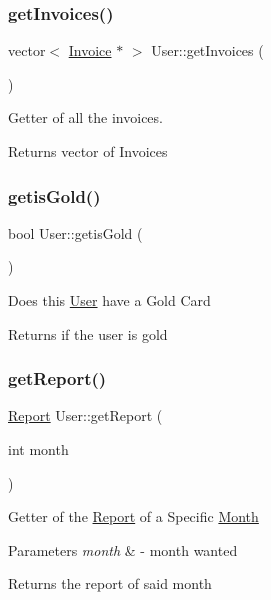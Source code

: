 \subsubsection{\texorpdfstring{get\+Invoices()}{getInvoices()}}
{\footnotesize\ttfamily vector$<$ \mbox{\hyperlink{class_invoice}{Invoice}} $\ast$ $>$ User\+::get\+Invoices (\begin{DoxyParamCaption}{ }\end{DoxyParamCaption})}



Getter of all the invoices. 

\begin{DoxyReturn}{Returns}
vector of Invoices 
\end{DoxyReturn}
\mbox{\label{class_user_ac1af1ded379bd2fd56f96f90348520fe}} 
\subsubsection{\texorpdfstring{getis\+Gold()}{getisGold()}}
{\footnotesize\ttfamily bool User\+::getis\+Gold (\begin{DoxyParamCaption}{ }\end{DoxyParamCaption})}

Does this \mbox{\hyperlink{class_user}{User}} have a Gold Card \begin{DoxyReturn}{Returns}
if the user is gold 
\end{DoxyReturn}
\mbox{\label{class_user_ad5f236ca0846ae3fc493609f72d17a70}} 
\subsubsection{\texorpdfstring{get\+Report()}{getReport()}}
{\footnotesize\ttfamily \mbox{\hyperlink{class_report}{Report}} User\+::get\+Report (\begin{DoxyParamCaption}\item[{int}]{month }\end{DoxyParamCaption})}

Getter of the \mbox{\hyperlink{class_report}{Report}} of a Specific \mbox{\hyperlink{class_month}{Month}} 
\begin{DoxyParams}{Parameters}
{\em month} & -\/ month wanted \\
\hline
\end{DoxyParams}
\begin{DoxyReturn}{Returns}
the report of said month 
\end{DoxyReturn}
\mbox{\label{class_user_a7443c5c7b1cca31c8400130568050327}} 
